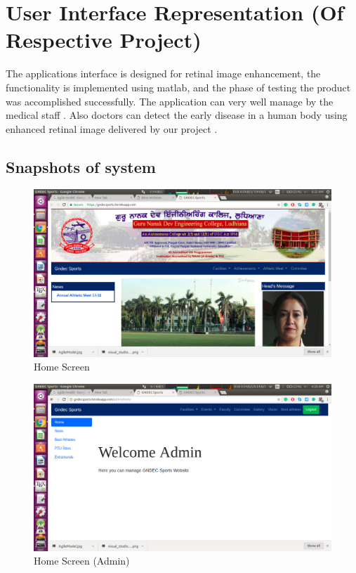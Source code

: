 \section{User Interface Representation (Of  Respective Project)}

The applications interface is designed for retinal image enhancement, the functionality is implemented using matlab, and the phase of testing the product was accomplished successfully. The application can very well manage by the medical staff .
Also doctors can detect the early disease in a human body using enhanced retinal image delivered by our project .
  



\subsection{Snapshots of system}


\begin{figure}[ht]
\centering
\includegraphics[scale=0.28]{images/HomeUserHeroku.png}
\caption{Home Screen}
\end{figure}

\newpage
\begin{figure}[ht]
\centering
\includegraphics[scale=0.35]{images/HomeAdminHeroku.png}
\caption{Home Screen (Admin)}
\end{figure}


